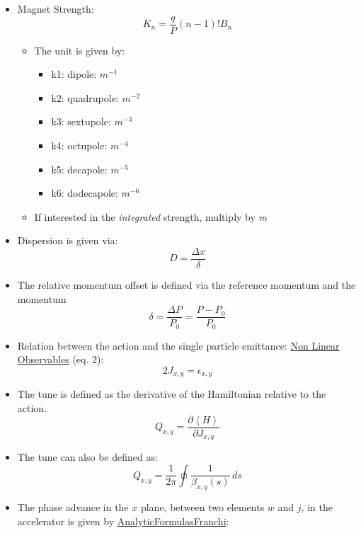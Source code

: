 \begin{itemize}
\item
  Magnet Strength:
  \begin{equation}K_{n} = \frac{q}{P} (n-1)!B_n\label{eq:magnet_strength}\end{equation}

  \begin{itemize}
  \item
    The unit is given by:

    \begin{itemize}
    \tightlist
    \item
      k1: dipole: \(m^{-1}\)
    \item
      k2: quadrupole: \(m^{-2}\)
    \item
      k3: sextupole: \(m^{-3}\)
    \item
      k4: octupole: \(m^{-4}\)
    \item
      k5: decapole: \(m^{-5}\)
    \item
      k6: dodecapole: \(m^{-6}\)
    \end{itemize}
  \item
    If interested in the \emph{integrated} strength, multiply by
    \emph{m}
  \end{itemize}
\item
  Dispersion is given via:
  \begin{equation}D = \frac{\Delta x}{\delta}\end{equation}
\item
  The relative momentum offset is defined via the reference momentum and
  the momentum
  \begin{equation}\delta = \frac{\Delta P}{P_0} = \frac{P - P_0}{P_0}\label{eq:dpp}\end{equation}
\item
  Relation between the action and the single particle emittance:
  \href{https://journals.aps.org/prab/pdf/10.1103/PhysRevSTAB.17.081002}{Non
  Linear Observables} (eq. 2):
  \begin{equation}2J_{x,y} = \epsilon_{x,y}\end{equation}
\item
  The tune is defined as the derivative of the Hamiltonian relative to
  the action.
  \begin{equation}Q_{x,y} = \frac{\partial \left< H \right>}{\partial J_{x,y}}\end{equation}
\item
  The tune can also be defined as:
  \begin{equation}Q_{x,y} = \frac{1}{2 \pi} \oint \frac{1}{\beta_{x,y}(s)} \,ds\end{equation}
\item
  The phase advance in the \(x\) plane, between two elements \(w\) and
  \(j\), in the accelerator is given by
  \href{https://arxiv.org/abs/1711.06589}{AnalyticFormulasFranchi}:
\end{itemize}

